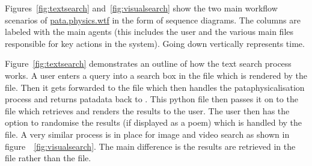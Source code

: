 Figures~\ref{fig:textsearch} and~\ref{fig:visualsearch} show the two main workflow scenarios of \url{pata.physics.wtf} in the form of sequence diagrams. The columns are labeled with the main agents (this includes the user and the various main files responsible for key actions in the system). Going down vertically represents time. 

Figure~\ref{fig:textsearch} demonstrates an outline of how the text search process works. A user enters a query into a search box in the  file which is rendered by the  file. Then it gets forwarded to the  file which then handles the pataphysicalisation process and returns patadata back to . This python file then passes it on to the  file which retrieves and renders the results to the user. The user then has the option to randomise the results (if displayed as a poem) which is handled by the  file. A very similar process is in place for image and video search as shown in figure~~\ref{fig:visualsearch}. The main difference is the results are retrieved in the  file rather than the  file.

